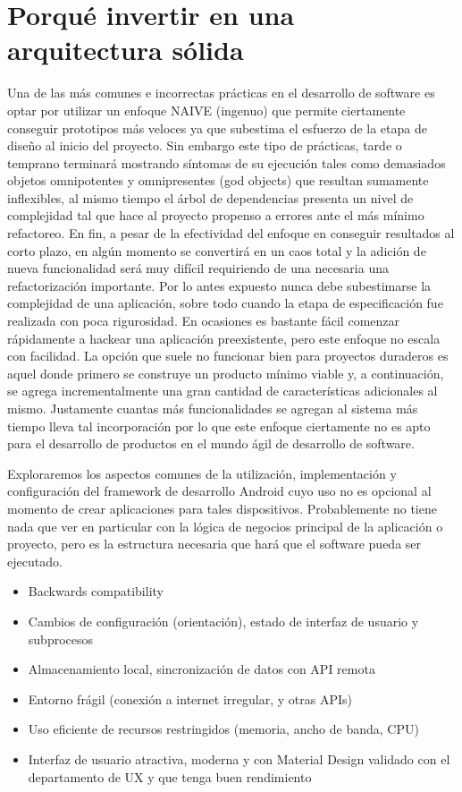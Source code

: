 \section{Porqué invertir en una arquitectura sólida}
Una de las más comunes e incorrectas prácticas en el desarrollo de software es optar por utilizar un enfoque NAIVE (ingenuo) que permite ciertamente conseguir prototipos más veloces ya que subestima el esfuerzo de la etapa de diseño al inicio del proyecto. Sin embargo este tipo de prácticas, tarde o temprano terminará mostrando síntomas de su ejecución tales como demasiados objetos omnipotentes y omnipresentes (god objects) que resultan sumamente inflexibles, al mismo tiempo el árbol de dependencias presenta un nivel de complejidad tal que hace al proyecto propenso a errores ante el más mínimo refactoreo. En fin, a pesar de la efectividad del enfoque en conseguir resultados al corto plazo, en algún momento se convertirá en un caos total y la adición de nueva funcionalidad será muy difícil requiriendo de una necesaria una refactorización importante. Por lo antes expuesto nunca debe subestimarse la complejidad de una aplicación, sobre todo cuando la etapa de especificación fue realizada con poca rigurosidad.
En ocasiones es bastante fácil comenzar rápidamente a hackear una aplicación preexistente, pero este enfoque no escala con facilidad. La opción que suele no funcionar bien para proyectos duraderos es aquel donde primero se construye un producto mínimo viable y, a continuación, se agrega incrementalmente una gran cantidad de características adicionales al mismo. Justamente cuantas más funcionalidades se agregan al sistema más tiempo lleva tal incorporación por lo que este enfoque ciertamente no es apto para el desarrollo de productos en el mundo ágil de desarrollo de software.


Exploraremos los aspectos comunes de la utilización, implementación y configuración del framework de desarrollo Android cuyo uso no es opcional al momento de crear aplicaciones para tales dispositivos. Probablemente no tiene nada que ver en particular con la lógica de negocios principal de la aplicación o proyecto, pero es la estructura necesaria que hará que el software pueda ser ejecutado.

\begin{itemize}
	\item Backwards compatibility
	\item Cambios de configuración (orientación), estado de interfaz de usuario y subprocesos
	\item Almacenamiento local, sincronización de datos con API remota
	\item Entorno frágil (conexión a internet irregular, y otras APIs)
	\item Uso eficiente de recursos restringidos (memoria, ancho de banda, CPU)
	\item Interfaz de usuario atractiva, moderna y con Material Design  validado con el departamento de UX y que tenga buen rendimiento
	
\end{itemize}

